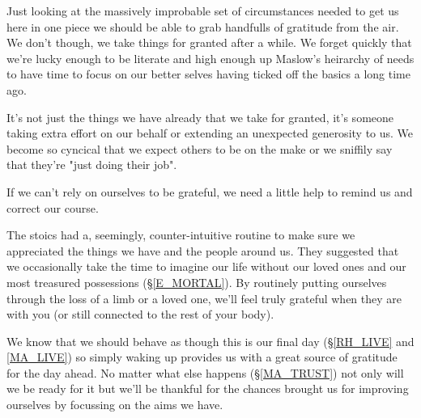 \cleartorightpage
\begin{multicols}{2}

Just looking at the massively improbable set of circumstances needed to get us here in one piece we should be able to grab handfulls of gratitude from the air. We don't though, we take things for granted after a while. We forget quickly that we're lucky enough to be literate and high enough up Maslow's heirarchy of needs to have time to focus on our better selves having ticked off the basics a long time ago. 

It's not just the things we have already that we take for granted, it's someone taking extra effort on our behalf or extending an unexpected generosity to us. We become so cyncical that we expect others to be on the make or we sniffily say that they're "just doing their job".

If we can't rely on ourselves to be  grateful, we need a little help to remind us and correct our course.

The stoics had a, seemingly, counter-intuitive routine to make sure we appreciated the things we have and the people around us. They suggested that we occasionally take the time to imagine our life without our loved ones and our most treasured possessions (\S \ref{E_MORTAL}). By routinely putting ourselves through the loss of a limb or a loved one, we'll feel truly grateful when they are with you (or still connected to the rest of your body).

We know that we should behave as though this is our final day (\S \ref{RH_LIVE} and \ref{MA_LIVE}) so simply waking up provides us with a great source of gratitude for the day ahead. No matter what else happens (\S \ref{MA_TRUST}) not only will we be ready for it but we'll be thankful for the chances brought us for improving ourselves by focussing on the aims we have.

\end{multicols}
\clearpage
